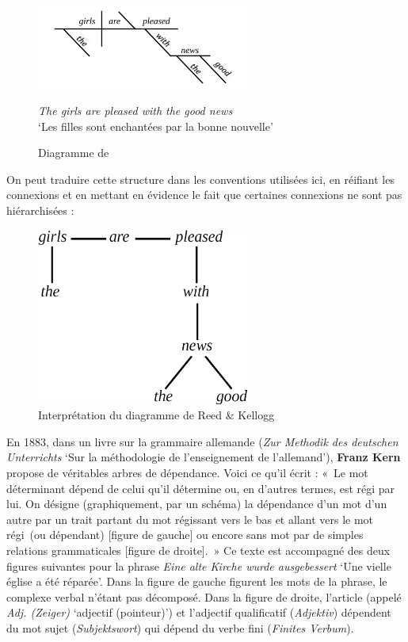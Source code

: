 {    \begin{figure}
    \includegraphics[width=7cm]{figures/ReedKellog}\medskip\\
    \raggedright\textit{The girls are pleased with the good news}\\
    ‘Les filles sont enchantées par la bonne nouvelle’\\
    \caption{Diagramme de \citet{ReedKellogg1877}}
    \end{figure}

    On peut traduire cette structure dans les conventions utilisées ici, en réifiant les connexions et en mettant en évidence le fait que certaines connexions ne sont pas hiérarchisées :

    \begin{figure}
    \caption{Interprétation du diagramme de Reed \& Kellogg}
    \includegraphics[width=7cm]{figures/ReedKellogTree}    
    \end{figure}

    En 1883, dans un livre sur la grammaire allemande (\textit{Zur Methodik des deutschen Unterrichts} ‘Sur la méthodologie de l’enseignement de l’allemand’), \textbf{Franz Kern} propose de véritables arbres de dépendance. Voici ce qu’il écrit : «~Le mot déterminant dépend de celui qu’il détermine ou, en d’autres termes, est régi par lui. On désigne (graphiquement, par un schéma) la dépendance d’un mot d’un autre par un trait partant du mot régissant vers le bas et allant vers le mot régi~(ou dépendant) [figure de gauche] ou encore sans mot par de simples relations grammaticales [figure de droite].~» Ce texte est accompagné des deux figures suivantes pour la phrase \textit{Eine alte Kirche wurde ausgebessert} ‘Une vielle église a été réparée’. Dans la figure de gauche figurent les mots de la phrase, le complexe verbal n’étant pas décomposé. Dans la figure de droite, l’article (appelé \textit{Adj. (Zeiger)} ‘adjectif (pointeur)’) et l’adjectif qualificatif (\textit{Adjektiv}) dépendent du mot sujet (\textit{Subjektswort}) qui dépend du verbe fini (\textit{Finites Verbum}).

}
